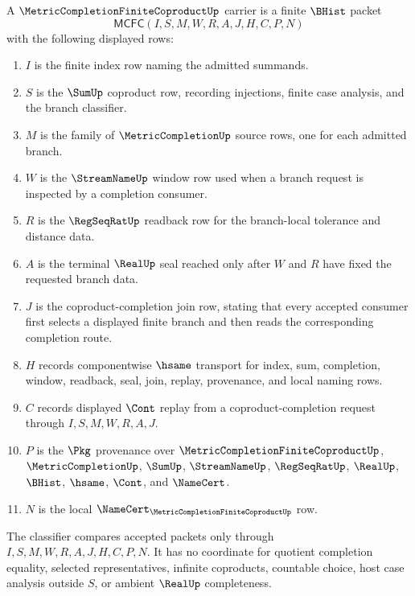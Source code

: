 \begin{definition}
\label{def:metric-completion-finite-coproduct-carrier}
A $\MetricCompletionFiniteCoproductUp$ carrier is a finite $\BHist$ packet
$$
\mathsf{MCFC}(I,S,M,W,R,A,J,H,C,P,N)
$$
with the following displayed rows:
\begin{enumerate}
\item $I$ is the finite index row naming the admitted summands.
\item $S$ is the $\SumUp$ coproduct row, recording injections, finite case analysis, and the branch classifier.
\item $M$ is the family of $\MetricCompletionUp$ source rows, one for each admitted branch.
\item $W$ is the $\StreamNameUp$ window row used when a branch request is inspected by a completion consumer.
\item $R$ is the $\RegSeqRatUp$ readback row for the branch-local tolerance and distance data.
\item $A$ is the terminal $\RealUp$ seal reached only after $W$ and $R$ have fixed the requested branch data.
\item $J$ is the coproduct-completion join row, stating that every accepted consumer first selects a displayed finite branch and then reads the corresponding completion route.
\item $H$ records componentwise $\hsame$ transport for index, sum, completion, window, readback, seal, join, replay, provenance, and local naming rows.
\item $C$ records displayed $\Cont$ replay from a coproduct-completion request through $I,S,M,W,R,A,J$.
\item $P$ is the $\Pkg$ provenance over $\MetricCompletionFiniteCoproductUp$, $\MetricCompletionUp$, $\SumUp$, $\StreamNameUp$, $\RegSeqRatUp$, $\RealUp$, $\BHist$, $\hsame$, $\Cont$, and $\NameCert$.
\item $N$ is the local $\NameCert_{\MetricCompletionFiniteCoproductUp}$ row.
\end{enumerate}
The classifier compares accepted packets only through $I,S,M,W,R,A,J,H,C,P,N$. It has no coordinate for quotient completion equality, selected representatives, infinite coproducts, countable choice, host case analysis outside $S$, or ambient $\RealUp$ completeness.
\end{definition}

